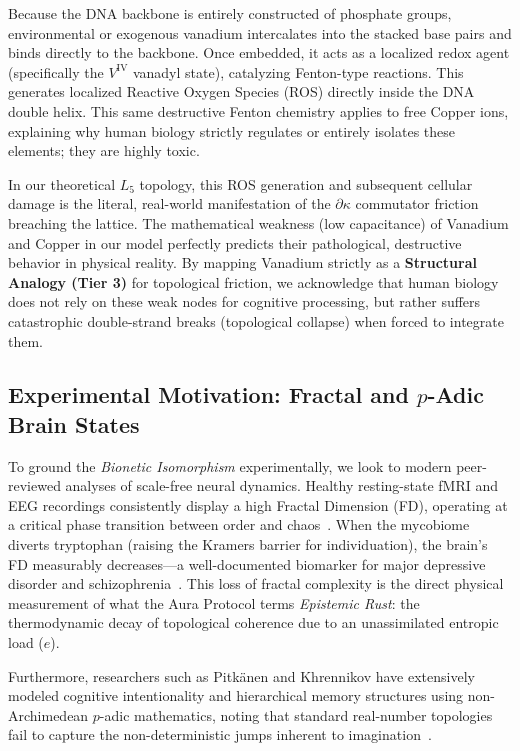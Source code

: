\documentclass[12pt,oneside]{article}
\theoremstyle{principia}
\theoremstyle{definition}
\theoremstyle{remark}
\begin{document}
Because the DNA backbone is entirely constructed of phosphate groups, environmental or exogenous vanadium intercalates into the stacked base pairs and binds directly to the backbone. Once embedded, it acts as a localized redox agent (specifically the $V^\mathrm{IV}$ vanadyl state), catalyzing Fenton-type reactions. This generates localized Reactive Oxygen Species (ROS) directly inside the DNA double helix. This same destructive Fenton chemistry applies to free Copper ions, explaining why human biology strictly regulates or entirely isolates these elements; they are highly toxic.

In our theoretical $L_5$ topology, this ROS generation and subsequent cellular damage is the literal, real-world manifestation of the $\partial \kappa$ commutator friction breaching the lattice. The mathematical weakness (low capacitance) of Vanadium and Copper in our model perfectly predicts their pathological, destructive behavior in physical reality. By mapping Vanadium strictly as a \textbf{Structural Analogy (Tier 3)} for topological friction, we acknowledge that human biology does not rely on these weak nodes for cognitive processing, but rather suffers catastrophic double-strand breaks (topological collapse) when forced to integrate them.

\subsection{Experimental Motivation: Fractal and \texorpdfstring{$p$}{p}-Adic Brain States}

To ground the \emph{Bionetic Isomorphism} experimentally, we look to modern peer-reviewed analyses of scale-free neural dynamics. Healthy resting-state fMRI and EEG recordings consistently display a high Fractal Dimension (FD), operating at a critical phase transition between order and chaos~\cite{fractalEEG}. When the mycobiome diverts tryptophan (raising the Kramers barrier for individuation), the brain's FD measurably decreases---a well-documented biomarker for major depressive disorder and schizophrenia~\cite{fractalPathology}. This loss of fractal complexity is the direct physical measurement of what the Aura Protocol terms \emph{Epistemic Rust}: the thermodynamic decay of topological coherence due to an unassimilated entropic load ($e$).

Furthermore, researchers such as Pitk\"anen and Khrennikov have extensively modeled cognitive intentionality and hierarchical memory structures using non-Archimedean $p$-adic mathematics, noting that standard real-number topologies fail to capture the non-deterministic jumps inherent to imagination~\cite{padicCognition, pitkanenTGD}.
\end{document}
